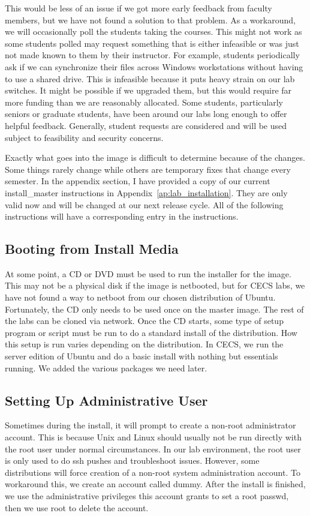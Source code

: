 This would be less of an issue if we got more early feedback from faculty members, but we have not found a solution to that problem.  As a workaround, we will occasionally poll the students taking the courses.  This might not work as some students polled may request something that is either infeasible or was just not made known to them by their instructor.  For example, students periodically ask if we can synchronize their files across Windows workstations without having to use a shared drive.  This is infeasible because it puts heavy strain on our lab switches.  It might be possible if we upgraded them, but this would require far more funding than we are reasonably allocated.  Some students, particularly seniors or graduate students, have been around our labs long enough to offer helpful feedback.  Generally, student requests are considered and will be used subject to feasibility and security concerns. 

Exactly what goes into the image is difficult to determine because of the changes.  Some things rarely change while others are temporary fixes that change every semester.  In the appendix section, I have provided a copy of our current install\_master instructions in Appendix~\ref{ap:lab_installation}.  They are only valid now and will be changed at our next release cycle.  All of the following instructions will have a corresponding entry in the instructions. 

\subsection{Booting from Install Media}
At some point, a CD or DVD must be used to run the installer for the image.  This may not be a physical disk if the image is netbooted, but for CECS labs, we have not found a way to netboot from our chosen distribution of Ubuntu.  Fortunately, the CD only needs to be used once on the master image.  The rest of the labs can be cloned via network.  Once the CD starts, some type of setup program or script must be run to do a standard install of the distribution.  How this setup is run varies depending on the distribution.  In CECS, we run the server edition of Ubuntu and do a basic install with nothing but essentials running.  We added the various packages we need later.  

\subsection{Setting Up Administrative User}
Sometimes during the install, it will prompt to create a non-root administrator account.  This is because Unix and Linux should usually not be run directly with the root user under normal circumstances.  In our lab environment, the root user is only used to do ssh pushes and troubleshoot issues.  However, some distributions will force creation of a non-root system administration account.  To workaround this, we create an account called dummy.  After the install is finished, we use the administrative privileges this account grants to set a root passwd, then we use root to delete the account.  

